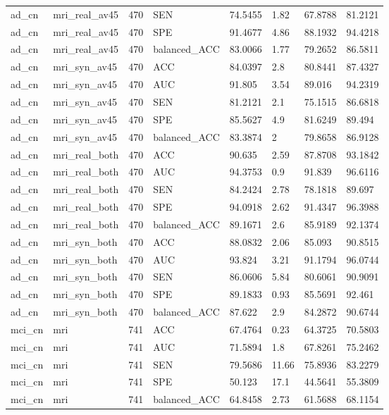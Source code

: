 \begin{landscape}
\begin{longtable}{llllllll}
ad\_cn & mri\_real\_av45 & 470 & SEN & 74.5455 & 1.82 & 67.8788 & 81.2121 \\
ad\_cn & mri\_real\_av45 & 470 & SPE & 91.4677 & 4.86 & 88.1932 & 94.4218 \\
ad\_cn & mri\_real\_av45 & 470 & balanced\_ACC & 83.0066 & 1.77 & 79.2652 & 86.5811 \\
ad\_cn & mri\_syn\_av45 & 470 & ACC & 84.0397 & 2.8 & 80.8441 & 87.4327 \\
ad\_cn & mri\_syn\_av45 & 470 & AUC & 91.805 & 3.54 & 89.016 & 94.2319 \\
ad\_cn & mri\_syn\_av45 & 470 & SEN & 81.2121 & 2.1 & 75.1515 & 86.6818 \\
ad\_cn & mri\_syn\_av45 & 470 & SPE & 85.5627 & 4.9 & 81.6249 & 89.494 \\
ad\_cn & mri\_syn\_av45 & 470 & balanced\_ACC & 83.3874 & 2 & 79.8658 & 86.9128 \\
ad\_cn & mri\_real\_both & 470 & ACC & 90.635 & 2.59 & 87.8708 & 93.1842 \\
ad\_cn & mri\_real\_both & 470 & AUC & 94.3753 & 0.9 & 91.839 & 96.6116 \\
ad\_cn & mri\_real\_both & 470 & SEN & 84.2424 & 2.78 & 78.1818 & 89.697 \\
ad\_cn & mri\_real\_both & 470 & SPE & 94.0918 & 2.62 & 91.4347 & 96.3988 \\
ad\_cn & mri\_real\_both & 470 & balanced\_ACC & 89.1671 & 2.6 & 85.9189 & 92.1374 \\
ad\_cn & mri\_syn\_both & 470 & ACC & 88.0832 & 2.06 & 85.093 & 90.8515 \\
ad\_cn & mri\_syn\_both & 470 & AUC & 93.824 & 3.21 & 91.1794 & 96.0744 \\
ad\_cn & mri\_syn\_both & 470 & SEN & 86.0606 & 5.84 & 80.6061 & 90.9091 \\
ad\_cn & mri\_syn\_both & 470 & SPE & 89.1833 & 0.93 & 85.5691 & 92.461 \\
ad\_cn & mri\_syn\_both & 470 & balanced\_ACC & 87.622 & 2.9 & 84.2872 & 90.6744 \\
mci\_cn & mri & 741 & ACC & 67.4764 & 0.23 & 64.3725 & 70.5803 \\
mci\_cn & mri & 741 & AUC & 71.5894 & 1.8 & 67.8261 & 75.2462 \\
mci\_cn & mri & 741 & SEN & 79.5686 & 11.66 & 75.8936 & 83.2279 \\
mci\_cn & mri & 741 & SPE & 50.123 & 17.1 & 44.5641 & 55.3809 \\
mci\_cn & mri & 741 & balanced\_ACC & 64.8458 & 2.73 & 61.5688 & 68.1154 \\

\end{longtable}
\end{landscape}
